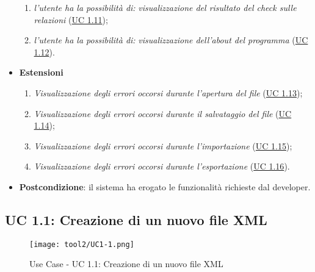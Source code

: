 \begin{itemize}
\begin{enumerate}
				\item \textit{l'utente ha la possibilità di:} \textit{visualizzazione del risultato del check sulle relazioni} (\hyperref[subsec:XEUC1.11]{UC 1.11});
				
				\item \textit{l'utente ha la possibilità di:} \textit{visualizzazione dell'about del programma} (\hyperref[subsec:XEUC1.12]{UC 1.12}).
				
			\end{enumerate}
			\item \textbf{Estensioni}
			\begin{enumerate}
				\item\textit{Visualizzazione degli errori occorsi durante l'apertura del file} (\hyperref[subsec:XEUC1.13]{UC 1.13});
				
				\item\textit{Visualizzazione degli errori occorsi durante il salvataggio del file} (\hyperref[subsec:XEUC1.14]{UC 1.14});
				
				\item\textit{Visualizzazione degli errori occorsi durante l'importazione} (\hyperref[subsec:XEUC1.15]{UC 1.15});
				
				\item\textit{Visualizzazione degli errori occorsi durante l'esportazione} (\hyperref[subsec:XEUC1.16]{UC 1.16}).
			\end{enumerate}
			\item\textbf{Postcondizione}: il sistema ha erogato le funzionalità richieste dal developer.
		\end{itemize}

	\subsection{UC 1.1: Creazione di un nuovo file XML}
		\label{subsec:XEUC1.1}
	
		\begin{figure}[!h] 
			\centering 
			\texttt{[image: tool2/UC1-1.png]} 
			\caption{Use Case - UC 1.1: Creazione di un nuovo file XML}
		\end{figure}
		
